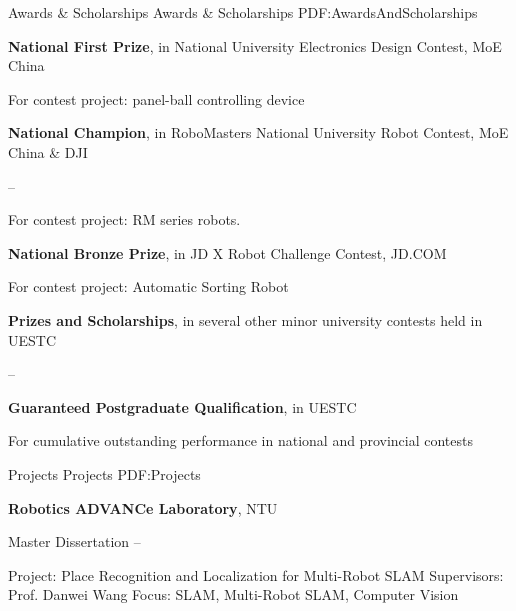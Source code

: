 \documentclass[letterpaper,MMMyyyy,nonstopmode]{simpleresumecv}
\begin{document}
\begin{Body}

\Section
{Awards \&\newline
	Scholarships}
{Awards \& Scholarships}
{PDF:AwardsAndScholarships}

\BulletItem
\textbf{National First Prize},
in National  University Electronics Design Contest, 
MoE China
\hfill
{}
\begin{Detail}
	\Item
	For contest project: panel-ball controlling device
\end{Detail}

\Gap
\BulletItem
\textbf{National Champion},
in RoboMasters National University Robot Contest,
MoE China \& DJI

\hfill
{} --
\begin{Detail}
	\Item
	For contest project: RM series robots.
\end{Detail}

\Gap
\BulletItem
\textbf{National Bronze Prize},
in JD X Robot Challenge Contest,
JD.COM
\hfill
{}
\begin{Detail}
	\Item
	For contest project: Automatic Sorting Robot
\end{Detail}

\Gap
\BulletItem
\textbf{Prizes and Scholarships}, 
in several other minor university contests held in UESTC

\hfill
{} --

\Gap
\BulletItem
\textbf{Guaranteed Postgraduate Qualification},
in UESTC
\hfill
{}
\begin{Detail}
	\Item
	For cumulative outstanding performance in national and provincial contests
\end{Detail}


\Section
{Projects}
{Projects}
{PDF:Projects}

\Entry
{\textbf{Robotics ADVANCe Laboratory}},
NTU

\Gap
\BulletItem
Master Dissertation
\hfill
{} --
\begin{Detail}
\SubBulletItem
Project:
Place Recognition and Localization for Multi-Robot SLAM
\SubBulletItem
Supervisors:
Prof. Danwei Wang
\SubBulletItem
Focus:
SLAM, Multi-Robot SLAM, Computer Vision
\end{Detail}


\end{Body}
\end{document}
